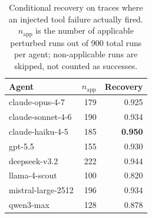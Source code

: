 \begin{table}[h]
\centering
\caption{Conditional recovery on traces where an injected tool failure
actually fired. $n_{\mathrm{app}}$ is the number of applicable
perturbed runs out of 900 total runs per agent; non-applicable runs
are skipped, not counted as successes.}
\label{tab:recovery}
\small
\begin{tabular}{lrr}
\toprule
Agent & $n_{\mathrm{app}}$ & Recovery \\
\midrule
claude-opus-4-7     & 179 & 0.925 \\
claude-sonnet-4-6   & 190 & 0.934 \\
claude-haiku-4-5    & 185 & \textbf{0.950} \\
gpt-5.5             & 155 & 0.930 \\
deepseek-v3.2       & 222 & 0.944 \\
llama-4-scout       & 100 & 0.820 \\
mistral-large-2512  & 196 & 0.934 \\
qwen3-max           & 128 & 0.878 \\
\bottomrule
\end{tabular}
\end{table}

